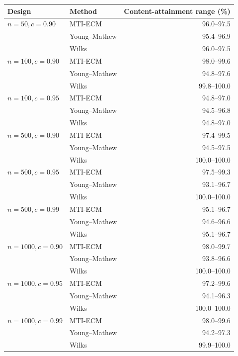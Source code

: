\begin{tabular}{@{}l@{\hspace{0.75em}}l@{\hspace{0.75em}}r@{}}
\toprule
Design & Method & Content-attainment range (\%)\\
\midrule
\(n=50, c=0.90\) & MTI-ECM & 96.0--97.5\\
 & Young--Mathew & 95.4--96.9\\
 & Wilks & 96.0--97.5\\
\addlinespace[0.3em]
\(n=100, c=0.90\) & MTI-ECM & 98.0--99.6\\
 & Young--Mathew & 94.8--97.6\\
 & Wilks & 99.8--100.0\\
\addlinespace[0.3em]
\(n=100, c=0.95\) & MTI-ECM & 94.8--97.0\\
 & Young--Mathew & 94.5--96.8\\
 & Wilks & 94.8--97.0\\
\addlinespace[0.3em]
\(n=500, c=0.90\) & MTI-ECM & 97.4--99.5\\
 & Young--Mathew & 94.5--97.5\\
 & Wilks & 100.0--100.0\\
\addlinespace[0.3em]
\(n=500, c=0.95\) & MTI-ECM & 97.5--99.3\\
 & Young--Mathew & 93.1--96.7\\
 & Wilks & 100.0--100.0\\
\addlinespace[0.3em]
\(n=500, c=0.99\) & MTI-ECM & 95.1--96.7\\
 & Young--Mathew & 94.6--96.6\\
 & Wilks & 95.1--96.7\\
\addlinespace[0.3em]
\(n=1000, c=0.90\) & MTI-ECM & 98.0--99.7\\
 & Young--Mathew & 93.8--96.6\\
 & Wilks & 100.0--100.0\\
\addlinespace[0.3em]
\(n=1000, c=0.95\) & MTI-ECM & 97.2--99.6\\
 & Young--Mathew & 94.1--96.3\\
 & Wilks & 100.0--100.0\\
\addlinespace[0.3em]
\(n=1000, c=0.99\) & MTI-ECM & 98.0--99.6\\
 & Young--Mathew & 94.2--97.3\\
 & Wilks & 99.9--100.0\\
\bottomrule
\end{tabular}
